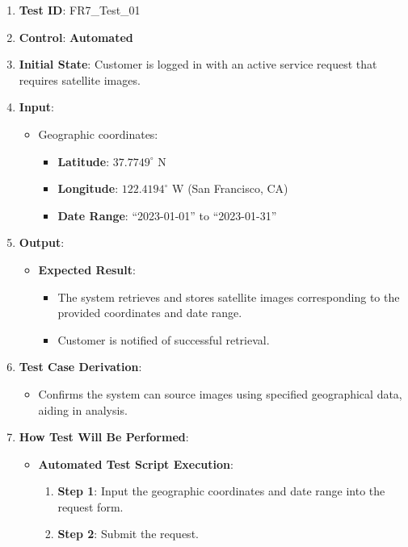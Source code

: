 \documentclass[12pt, titlepage]{article}
\begin{document}
\begin{enumerate}
    \item \textbf{Test ID}: FR7\_Test\_01
    \item \textbf{Control}: \textbf{Automated}
    \item \textbf{Initial State}: Customer is logged in with an active service request that requires satellite images.
    \item \textbf{Input}:
    \begin{itemize}
        \item Geographic coordinates:
        \begin{itemize}
            \item \textbf{Latitude}: $37.7749^\circ$ N
            \item \textbf{Longitude}: $122.4194^\circ$ W (San Francisco, CA)
            \item \textbf{Date Range}: ``2023-01-01'' to ``2023-01-31''
        \end{itemize}
    \end{itemize}
    \item \textbf{Output}:
    \begin{itemize}
        \item \textbf{Expected Result}:
        \begin{itemize}
            \item The system retrieves and stores satellite images corresponding to the provided coordinates and date range.
            \item Customer is notified of successful retrieval.
        \end{itemize}
    \end{itemize}
    \item \textbf{Test Case Derivation}:
    \begin{itemize}
        \item Confirms the system can source images using specified geographical data, aiding in analysis.
    \end{itemize}
    \item \textbf{How Test Will Be Performed}:
    \begin{itemize}
        \item \textbf{Automated Test Script Execution}:
        \begin{enumerate}
            \item \textbf{Step 1}: Input the geographic coordinates and date range into the request form.
            \item \textbf{Step 2}: Submit the request.

\end{enumerate}
\end{itemize}
\end{enumerate}
\end{document}
